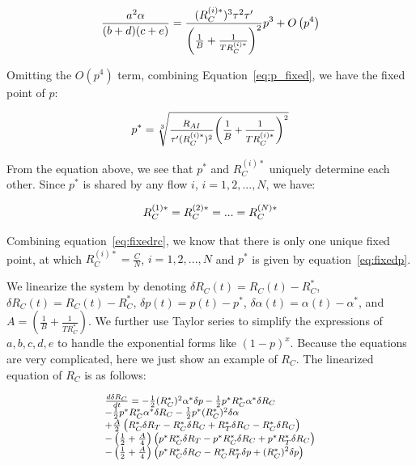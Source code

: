 \begin{equation}
\small
\frac{{{a^2}\alpha }}{{(b + d)(c + e)}} = \frac{{(R_C^{(i)*})^3{\tau ^2}\tau '}}{{{{\left( {\frac{1}{B} + \frac{1}{{TR_C^{(i)*}}}} \right)}^2}}}{p^3} + O\left( {{p^4}} \right)
\end{equation}

Omitting the $O(p^4)$ term, combining Equation~\ref{eq:p_fixed}, we have the fixed point of $p$:

\begin{equation}
\small
{p^*} = \sqrt[3]{{\frac{{{R_{AI}}}}{{{\tau '}(R_C^{(i)*})^2}}{{\left( {\frac{1}{B} + \frac{1}{TR_C^{(i)*}}} \right)}^2}}}
\label{eq:fixedp}
\end{equation}

From the equation above, we see that $p^*$ and $R_C^{(i)*}$ uniquely determine each other. 
Since $p^*$ is shared by any flow $i$, $i = 1, 2, ..., N$, we have:

\begin{equation}
\small
R_C^{(1)*} = R_C^{(2)*} = ... = R_C^{(N)*}
\end{equation}

Combining equation~\ref{eq:fixedrc}, we know that there is only one unique fixed point, at which
$R_C^{(i)*} = \frac{C}{N}$, $i = 1, 2, ..., N$ and $p^*$ is given by equation~\ref{eq:fixedp}.


We linearize the system by denoting $\delta {R_C}(t) = {R_C}(t) - R_C^*$, $\delta {R_C}(t) = {R_C}(t) - R_C^*$,
$\delta p(t) = p(t) - p^*$, $\delta \alpha (t) = \alpha (t) - \alpha^*$, and $A = \left( {\frac{1}{B} + \frac{1}{{TR_C^*}}} \right)$.
We further use Taylor series to simplify the expressions of $a, b, c, d, e$ to handle the exponential forms like $(1-p)^x$.
Because the equations are very complicated, here we just show an example of $R_C$. The linearized equation of $R_C$ is as follows:

\begin{equation}
\small
\begin{array}{l}
\frac{{d\delta {R_C}}}{{dt}} =  - \frac{1}{2}{(R_C^*)^2}{\alpha ^*}\delta p - \frac{1}{2}{p^*}R_C^*{\alpha ^*}\delta R_C \\
 - \frac{1}{2}{p^*}R_C^*{\alpha ^*}\delta {R_C} - \frac{1}{2}{p^*}{(R_C^*)^2}\delta \alpha \\
 + \frac{A}{2}\left( {R_C^*\delta {R_T} - R_C^*\delta {R_C} + R_T^*\delta {R_C} - R_C^*\delta R_C} \right)\\
 - \left( {\frac{1}{2} + \frac{A}{4}} \right)\left( {{p^*}R_C^*\delta {R_T} - {p^*}R_C^*\delta {R_C} + {p^*}R_T^*\delta {R_C}} \right)\\ 
 - \left( {\frac{1}{2} + \frac{A}{4}} \right)\left( {{p^*}R_C^*\delta R_C - R_C^*R_T^*\delta p + {{(R_C^*)}^2}\delta p} \right)
\end{array}
\end{equation}

